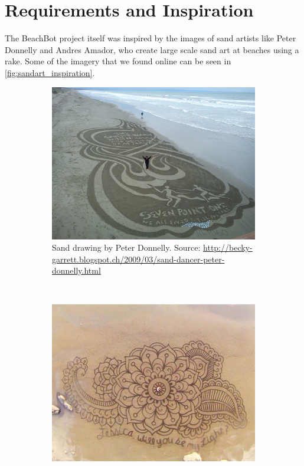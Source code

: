 \section{Requirements and Inspiration}

The BeachBot project itself was inspired by the images of sand artists like Peter Donnelly and Andres Amador, who create large scale sand art at beaches using a rake. Some of the imagery that we found online can be seen in \autoref{fig:sandart_inspiration}.

\begin{figure}
\centering
\begin{subfigure}[c]{1\textwidth}
\includegraphics[width=\textwidth]{images/requirements_inspiration/donnelly_1.jpg} 
\caption{Sand drawing by Peter Donnelly. Source: \url{http://becky-garrett.blogspot.ch/2009/03/sand-dancer-peter-donnelly.html}}
\end{subfigure}
\\
\begin{subfigure}[b]{0.46\textwidth}
\includegraphics[width=\textwidth]{images/requirements_inspiration/andres_armador_1.jpg} 

\end{subfigure}
\end{figure}
